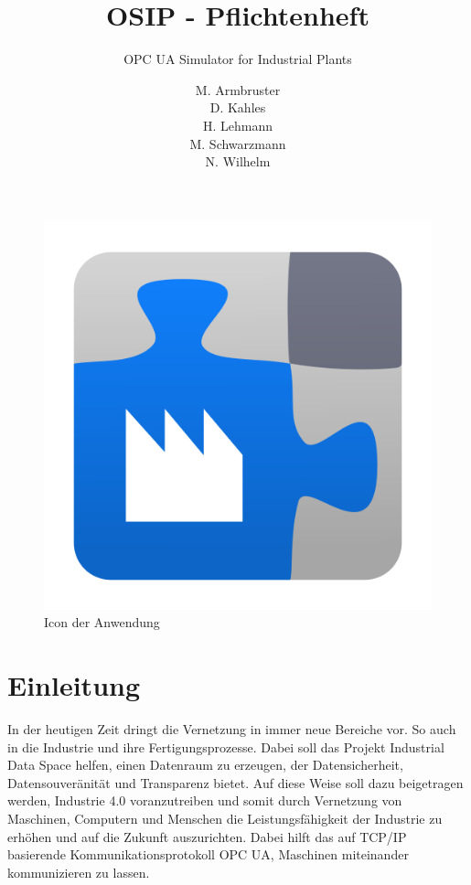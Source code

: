 \documentclass[parskip=full]{scrartcl}
\title{OSIP - Pflichtenheft}
\subtitle{\gls{OPC UA} Simulator for Industrial Plants}
\author{
    M. Armbruster\\
    D. Kahles\\
    H. Lehmann\\
    M. Schwarzmann\\
    N. Wilhelm
}
\begin{document}
\maketitle
\begin{figure}[h!]
  \centering
  \includegraphics[scale=0.5]{../icon.png}
  \caption{Icon der Anwendung}
\end{figure}
\pagebreak
\tableofcontents
\pagebreak

\section{Einleitung}
In der heutigen Zeit dringt die Vernetzung in immer neue Bereiche vor. So auch in die Industrie und ihre Fertigungsprozesse.
Dabei soll das Projekt \gls{Industrial Data Space} helfen, einen Datenraum zu erzeugen, der Datensicherheit, Datensouveränität und
Transparenz bietet. Auf diese Weise soll dazu beigetragen werden, Industrie 4.0 voranzutreiben und somit durch Vernetzung von
Maschinen, Computern und Menschen die Leistungsfähigkeit der Industrie zu erhöhen und auf die Zukunft auszurichten.
Dabei hilft das auf \gls{TCP/IP} basierende Kommunikationsprotokoll \gls{OPC UA}, Maschinen miteinander kommunizieren zu lassen.
\end{document}
